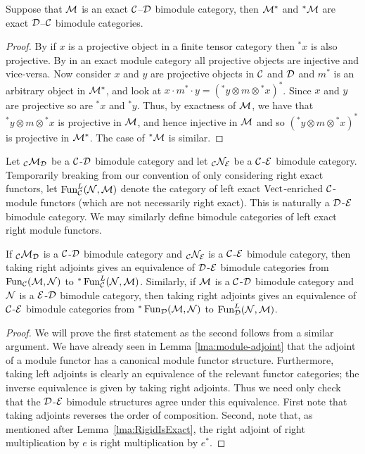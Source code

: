 \documentclass{amsart}
\begin{document}
\begin{lemma} \label{lem:adjoint-exactness}
Suppose that $\mathcal M$ is an exact $\mathcal C$--$\mathcal D$ bimodule category, then $\mathcal M^*$ and ${}^*\mathcal M$ are exact $\mathcal D$--$\mathcal C$ bimodule categories.
\end{lemma}
\begin{proof}
By \cite[Prop. 2.3]{MR2119143} if $x$ is a projective object in a finite tensor category then ${}^*x$ is also projective.  By \cite[Corollary 3.6]{MR2119143} in an exact module category all projective objects are injective and vice-versa.  Now consider $x$ and $y$ are projective objects in $\mathcal C$ and $\mathcal D$ and $m^*$ is an arbitrary object in $\mathcal M^*$, and look at $x \cdot m^* \cdot y = ({}^*y \otimes m \otimes {}^*x)^*$.  Since $x$ and $y$ are projective so are ${}^*x$ and ${}^*y$.  Thus, by exactness of $\mathcal M$, we have that ${}^*y \otimes m \otimes {}^*x$ is projective in $\mathcal M$, and hence injective in $\mathcal M$ and so  $({}^*y \otimes m \otimes {}^*x)^*$ is projective in $\mathcal M^*$.  The case of ${}^*\mathcal M$ is similar.
\end{proof}


\begin{definition}
	Let ${}_{\mathcal C}\mathcal M_\mathcal D$ be a $\mathcal C$-$\mathcal D$ bimodule category and let ${}_{\mathcal C}\mathcal N_\mathcal E$ be a $\mathcal C$-$\mathcal E$ bimodule category. Temporarily breaking from our convention of only considering right exact functors, let	 $\operatorname{Fun}^L_{\mathcal C}(\mathcal N, \mathcal M)$ denote the category of left exact $\mathrm{Vect}$-enriched $\mathcal C$-module functors (which are not necessarily right exact). This is naturally a $\mathcal D$-$\mathcal E$ bimodule category. We may similarly define bimodule categories of left exact right module functors. 
\end{definition}

\begin{lemma}
If ${}_{\mathcal C}\mathcal M_\mathcal D$ is a $\mathcal C$-$\mathcal D$ bimodule category and ${}_{\mathcal C}\mathcal N_\mathcal E$ is a $\mathcal C$-$\mathcal E$ bimodule category, then taking right adjoints gives an equivalence of $\mathcal D$-$\mathcal E$ bimodule categories 
from $\operatorname{Fun}_{\mathcal C}(\mathcal M, \mathcal N)$ to ${}^*\operatorname{Fun}^L_{\mathcal C}(\mathcal N, \mathcal M)$.
Similarly, if $\mathcal M$ is a $\mathcal C$-$\mathcal D$ bimodule category and $\mathcal N$ is a $\mathcal E$-$\mathcal D$ bimodule category, then taking right adjoints gives an equivalence of $\mathcal C$-$\mathcal E$ bimodule categories from ${}^*\operatorname{Fun}_{\mathcal D}(\mathcal M, \mathcal N)$ to $\operatorname{Fun}^L_{\mathcal D}(\mathcal N, \mathcal M)$. 
\end{lemma}
\begin{proof}
	We will prove the first statement as the second follows from a similar argument. 
We have already seen in Lemma \ref{lma:module-adjoint} that the adjoint of a module functor has a canonical module functor structure.  Furthermore, taking left adjoints is clearly an equivalence of the relevant functor categories; the inverse equivalence is given by taking right adjoints. Thus we need only check that the $\mathcal D$-$\mathcal E$ bimodule structures agree under this equivalence.  First note that taking adjoints reverses the order of composition. Second, note that, as mentioned after Lemma~\ref{lma:RigidIsExact}, the right adjoint of right multiplication by $e$ is right multiplication by $e^*$.
\end{proof}
\end{document}
